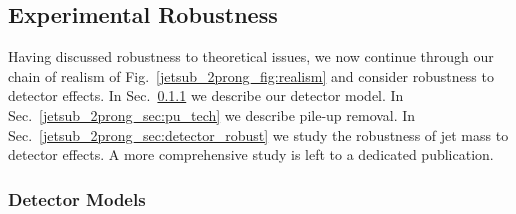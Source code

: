 \documentclass[11pt]{cernrep}
\begin{document}
\subsection{Experimental Robustness}\label{jetsub_2prong_sec:exp}

Having discussed robustness to theoretical issues, we now continue through our chain of realism of Fig.~\ref{jetsub_2prong_fig:realism} and consider robustness to detector effects.
%
In Sec.~\ref{jetsub_2prong_sec:det_model} we describe our detector model.
%
In Sec.~\ref{jetsub_2prong_sec:pu_tech} we describe pile-up removal.
%
In Sec.~\ref{jetsub_2prong_sec:detector_robust} we study the robustness of jet mass to detector effects.
%
A more comprehensive study is left to a dedicated publication.

\subsubsection{Detector Models}\label{jetsub_2prong_sec:det_model}
\end{document}
